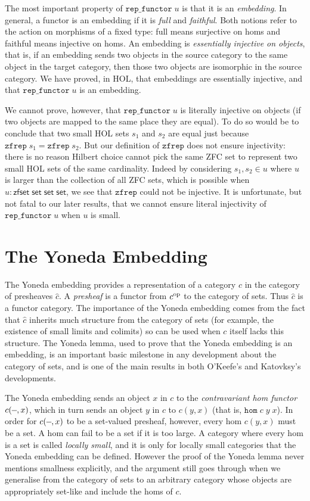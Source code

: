\documentclass[twoside,titlepage,11pt]{article}
\begin{document}
The most important property of $\mathtt{rep\_functor}\;u$ is that it is an \emph{embedding}.
In general, a functor is an embedding if it is \emph{full} and \emph{faithful}.
Both notions refer to the action on morphisms of a fixed type: full means surjective on homs and faithful means injective on homs.
An embedding is \emph{essentially injective on objects}, that is, if an embedding sends two objects in the source category to the same object in the target category, then those two objects are isomorphic in the source category.
We have proved, in HOL, that embeddings are essentially injective, and that $\mathtt{rep\_functor}\;u$ is an embedding.

We cannot prove, however, that $\mathtt{rep\_functor}\;u$ is literally injective on objects (if two objects are mapped to the same place they are equal).
To do so would be to conclude that two small HOL sets $s_1$ and $s_2$ are equal just because $\mathtt{zfrep}\;s_1=\mathtt{zfrep}\;s_2$.
But our definition of $\mathtt{zfrep}$ does not ensure injectivity: there is no reason Hilbert choice cannot pick the same ZFC set to represent two small HOL sets of the same cardinality.
Indeed by considering $s_1,s_2\in u$ where $u$ is larger than the collection of all ZFC sets, which is possible when $u:\mathsf{zfset}\;\mathsf{set}\;\mathsf{set}\;\mathsf{set}$, we see that $\mathtt{zfrep}$ could not be injective.
It is unfortunate, but not fatal to our later results, that we cannot ensure literal injectivity of $\mathtt{rep\_functor}\;u$ when $u$ is small.
\section{The Yoneda Embedding}%
\label{Yoneda}
\newcommand{\op}{\ensuremath{\sp{\mathrm{op}}}}
\newcommand{\blank}{\rule[0.5ex]{0.6em}{.4pt}}
The Yoneda embedding provides a representation of a category $c$ in the category of presheaves $\widehat{c}$.
A \emph{presheaf} is a functor from ${c}\op$ to the category of sets.
Thus $\widehat{c}$ is a functor category.
The importance of the Yoneda embedding comes from the fact that $\widehat{c}$ inherits much structure from the category of sets (for example, the existence of small limits and colimits) so can be used when $c$ itself lacks this structure.
The Yoneda lemma, used to prove that the Yoneda embedding is an embedding, is an important basic milestone in any development about the category of sets, and is one of the main results in both O'Keefe's and Katovksy's developments.

The Yoneda embedding sends an object $x$ in $c$ to the \emph{contravariant hom functor} $c(\blank,x)$, which in turn sends an object $y$ in $c$ to $c(y,x)$ (that is, $\mathtt{hom}\;c\;y\;x$).
In order for $c(\blank,x)$ to be a set-valued presheaf, however, every hom $c(y,x)$ must be a set.
A hom can fail to be a set if it is too large.
A category where every hom is a set is called \emph{locally small}, and it is only for locally small categories that the Yoneda embedding can be defined.
However the proof of the Yoneda lemma never mentions smallness explicitly, and the argument still goes through when we generalise from the category of sets to an arbitrary category whose objects are appropriately set-like and include the homs of $c$.
\end{document}
